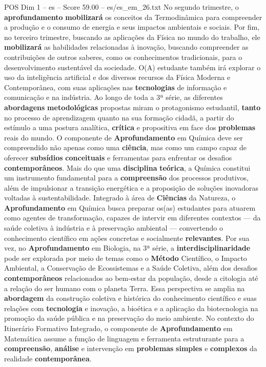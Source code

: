 \begin{textsample}{POS Dim 1 – es – Score 59.00 – es/es\_em\_26.txt}
No segundo trimestre, o \textbf{aprofundamento} \textbf{mobilizará} os conceitos da Termodinâmica para compreender a produção e o consumo de energia e seus impactos ambientais e sociais.
Por fim, no terceiro trimestre, buscando as aplicações da Física no mundo do trabalho, ele \textbf{mobilizará} as habilidades relacionadas à inovação, buscando compreender as contribuições de outros saberes, como os conhecimentos tradicionais, para o desenvolvimento sustentável da sociedade.
O(A) estudante também irá explorar o uso da inteligência artificial e dos diversos recursos da Física Moderna e Contemporânea, com suas aplicações nas \textbf{tecnologias} de informação e comunicação e na indústria.
Ao longo de toda a 3ª série, as diferentes \textbf{abordagens} \textbf{metodológicas} propostas miram o protagonismo estudantil, \textbf{tanto} no processo de aprendizagem quanto na sua formação cidadã, a partir do estímulo a uma postura analítica, \textbf{crítica} e propositiva em face dos \textbf{problemas} reais do mundo.
O componente de \textbf{Aprofundamento} em Química deve ser compreendido não apenas como uma \textbf{ciência}, mas como um campo capaz de oferecer \textbf{subsídios} \textbf{conceituais} e ferramentas para enfrentar os desafios \textbf{contemporâneos}.
Mais do que uma \textbf{disciplina} \textbf{teórica}, a Química constitui um instrumento fundamental para a \textbf{compreensão} dos processos produtivos, além de impulsionar a transição energética e a proposição de soluções inovadoras voltadas à sustentabilidade.
Integrado à área de \textbf{Ciências} da Natureza, o \textbf{Aprofundamento} em Química busca preparar os(as) estudantes para atuarem como agentes de transformação, capazes de intervir em diferentes contextos — da saúde coletiva à indústria e à preservação ambiental — convertendo o conhecimento científico em ações concretas e socialmente \textbf{relevantes}.
Por sua vez, no \textbf{Aprofundamento} em Biologia, na 3ª série, a \textbf{interdisciplinaridade} pode ser explorada por meio de temas como o \textbf{Método} Científico, o Impacto Ambiental, a Conservação de Ecossistemas e a Saúde Coletiva, além dos desafios \textbf{contemporâneos} relacionados ao bem-estar da população, desde a citologia até a relação do ser humano com o planeta Terra.
Essa perspectiva se amplia na \textbf{abordagem} da construção coletiva e histórica do conhecimento científico e suas relações com \textbf{tecnologia} e inovação, a bioética e a aplicação da biotecnologia na promoção da saúde pública e na preservação do meio ambiente.
No contexto do Itinerário Formativo Integrado, o componente de \textbf{Aprofundamento} em Matemática assume a função de linguagem e ferramenta estruturante para a \textbf{compreensão}, \textbf{análise} e intervenção em \textbf{problemas} \textbf{simples} e \textbf{complexos} da realidade \textbf{contemporânea}.

\end{textsample}
